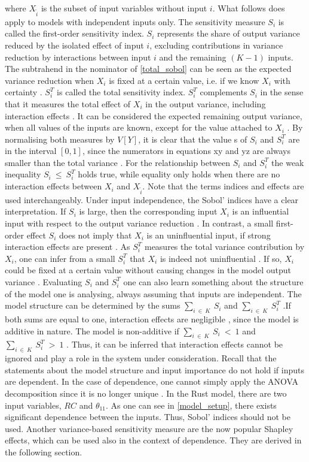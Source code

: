 where $X_{\tilde i}$ is the subset of input variables without input $i$. What follows does apply to models with independent inputs only. The sensitivity measure $S_i$ is called the first-order sensitivity index. $S_i$ represents the share of output variance reduced by the isolated effect of input $i$, excluding contributions in variance reduction by interactions between input $i$ and the remaining $(K-1)$ inputs. The subtrahend in the nominator of \cref{total_sobol} can be seen as the expected variance reduction when $X_i$ is fixed at a certain value, i.e. if we know $X_i$ with certainty \cite{SNS16}. $S_i^T$ is called the total sensitivity index. $S_i^T$ complements $S_i$ in the sense that it measures the total effect of $X_i$ in the output variance, including interaction effects \cite{SNS16}. It can be considered the expected remaining output variance, when all values of the inputs are known, except for the value attached to $X_i$ \cite{SNS16}. By normalising both measures by $V[Y]$, it is clear that the value s of $S_i$ and $S_i^T$ are in the interval $[0, 1]$, since the numerators in equations xy and yz are always smaller than the total variance \cite{GM17}. For the relationship between $S_i$ and $S_i^T$ the weak inequality $S_i\ \le\ S_i^T$ holds true, while equality only holds when there are no interaction effects between $X_i$ and $X_{\tilde i}$. Note that the terms indices and effects are used interchangeably.
Under input independence, the Sobol’ indices have a clear interpretation. If $S_i$ is large, then the corresponding input $X_i$ is an influential input with respect to the output variance reduction \cite{GM17}. In contrast, a small first-order effect $S_i$ does not imply that $X_i$ is an uninfluential input, if strong interaction effects are present \cite{GM17}. As $S_i^T$ measures the total variance contribution by $X_i$, one can infer from a small $S_i^T$ that $X_i$ is indeed not uninfluential \cite{GM17}. If so, $X_i$ could be fixed at a certain value without causing changes in the model output variance \cite{GM17}.
Evaluating $S_i$ and $S_i^T$ one can also learn something about the structure of the model one is analysing, always assuming that inputs are independent. The model structure can be determined by the sums $\sum_{i\ \in\ K}\ S_i$ and $\sum_{i\ \in\ K}\ S_i^T$ \cite{GM17}.If both sums are equal to one, interaction effects are negligible , since the model is additive in nature. The model is non-additive if $\sum_{i\ \in\ K}\ S_i\ <\ 1$ and $\sum_{i\ \in\ K}\ S_i^T\ >\ 1$ \cite{GM17}. Thus, it can be inferred that interaction effects cannot be ignored and play a role in the system under consideration.
Recall that the statements about the model structure and input importance do not hold if inputs are dependent. In the case of dependence, one cannot simply apply the ANOVA decomposition since it is no longer unique \cite{O14}. In the Rust model, there are two input variables, $RC$ and $\theta_{11}$. As one can see in \cref{model_setup}, there exists significant dependence between the inputs. Thus, Sobol’ indices should not be used. Another variance-based sensitivity measure are the now popular Shapley effects, which can be used also in the context of dependence. They are derived in the following section.

